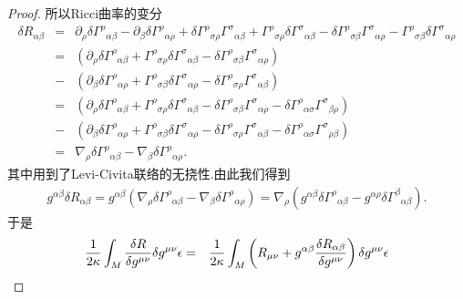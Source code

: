 \begin{proof}
            所以Ricci曲率的变分
            \begin{eqnarray*}
                \delta{R}_{\alpha\beta}&=&\partial_\rho\delta{\varGamma^\rho}_{\alpha\beta}-\partial_\beta\delta{\varGamma^\rho}_{\alpha\rho}+\delta{\varGamma^\rho}_{\sigma\rho}{\varGamma^\sigma}_{\alpha\beta}+{\varGamma^\rho}_{\sigma\rho}\delta{\varGamma^\sigma}_{\alpha\beta}-\delta{\varGamma^\rho}_{\sigma\beta}{\varGamma^\sigma}_{\alpha\rho}-{\varGamma^\rho}_{\sigma\beta}\delta{\varGamma^\sigma}_{\alpha\rho}\\
                &=&\left(\partial_\rho\delta{\varGamma^\rho}_{\alpha\beta}+{\varGamma^\rho}_{\sigma\rho}\delta{\varGamma^\sigma}_{\alpha\beta}-\delta{\varGamma^\rho}_{\sigma\beta}{\varGamma^\sigma}_{\alpha\rho}\right)\\
                &-&\left(\partial_\beta\delta{\varGamma^\rho}_{\alpha\rho}+{\varGamma^\rho}_{\sigma\beta}\delta{\varGamma^\sigma}_{\alpha\rho}-\delta{\varGamma^\rho}_{\sigma\rho}{\varGamma^\sigma}_{\alpha\beta}\right)\\
                &=&\left(\partial_\rho\delta{\varGamma^\rho}_{\alpha\beta}+{\varGamma^\rho}_{\sigma\rho}\delta{\varGamma^\sigma}_{\alpha\beta}-\delta{\varGamma^\rho}_{\sigma\beta}{\varGamma^\sigma}_{\alpha\rho}-\delta{\varGamma^\rho}_{\alpha\sigma}{\varGamma^\sigma}_{\beta\rho}\right)\\
                &-&\left(\partial_\beta\delta{\varGamma^\rho}_{\alpha\rho}+{\varGamma^\rho}_{\sigma\beta}\delta{\varGamma^\sigma}_{\alpha\rho}-\delta{\varGamma^\rho}_{\sigma\rho}{\varGamma^\sigma}_{\alpha\beta}-\delta{\varGamma^\rho}_{\alpha\sigma}{\varGamma^\sigma}_{\rho\beta}\right)\\
                &=&\nabla_\rho\delta{\varGamma^\rho}_{\alpha\beta}-\nabla_\beta\delta{\varGamma^\rho}_{\alpha\rho}.
            \end{eqnarray*}
            其中用到了Levi-Civita联络的无挠性.由此我们得到
            \begin{eqnarray*}
                g^{\alpha\beta}\delta{R}_{\alpha\beta}=g^{\alpha\beta}\left(\nabla_\rho\delta{\varGamma^\rho}_{\alpha\beta}-\nabla_\beta\delta{\varGamma^\rho}_{\alpha\rho}\right)=\nabla_\rho\left(g^{\alpha\beta}\delta{\varGamma^\rho}_{\alpha\beta}-g^{\alpha\rho}\delta{\varGamma^\beta}_{\alpha\beta}\right).
            \end{eqnarray*}
            于是
            \begin{eqnarray}\label{eq:delta EHA 1}
                \frac{1}{2\kappa}\int_M\frac{\delta R}{\delta g^{\mu\nu}}\delta g^{\mu\nu}\epsilon&=&\frac{1}{2\kappa}\int_M\left({R}_{\mu\nu}+g^{\alpha\beta}\frac{\delta {R}_{\alpha\beta}}{\delta g^{\mu\nu}}\right)\delta g^{\mu\nu}\epsilon\notag\\

\end{eqnarray}
\end{proof}
